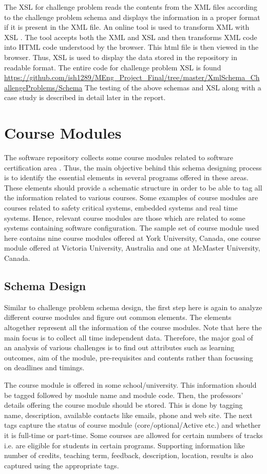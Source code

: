 \documentclass[11pt,letterpaper]{report}
\begin{document}
The XSL for challenge problem reads the contents from the XML files according to the challenge problem schema and displays the information in a proper format if it is present in the XML file. An online tool is used to transform XML with XSL \cite{olXSL}. The tool accepts both the XML and XSL and then transforms XML code into HTML code understood by the browser. This html file is then viewed in the browser. Thus, XSL is used to display the data stored in the repository in readable format. The entire code for challenge problem XSL is found \url{https://github.com/ish1289/MEng_Project_Final/tree/master/XmlSchema_ChallengeProblems/Schema}
\bigskip
The testing of the above schemas and XSL along with a case study is described in detail later in the report. 

\chapter{Course Modules}
The software repository collects some course modules related to software certification area \cite{York,Waterloo, MaC,Victoria}. Thus, the main objective behind this schema designing process is to identify the essential elements in several programs offered in these areas. These elements should provide a schematic structure in order to be able to tag all the information related to various courses. Some examples of course modules are courses related to safety critical systems, embedded systems and real time systems. Hence, relevant course modules are those which are related to some systems containing software configuration. The sample set of course module used here contains nine course modules offered at York University, Canada, one course module offered at Victoria University, Australia and one at McMaster University, Canada.

\section*{Schema Design}
Similar to challenge problem schema design, the first step here is again to analyze different course modules and figure out common elements. The elements altogether represent all the information of the course modules. Note that here the main focus is to collect all time independent data. Therefore, the major goal of an analysis of various challenges is to find out attributes such as learning outcomes, aim of the module, pre-requisites and contents rather than focussing on deadlines and timings.  

The course module is offered in some school/university. This information should be tagged followed by module name and module code. Then, the professors' details offering the course module should be stored. This is done by tagging name, description, available contacts like emails, phone and web site. The next tags capture the status of course module (core/optional/Active etc.) and whether it is full-time or part-time. Some courses are allowed for certain numbers of tracks i.e. are eligible for students in certain programs. Supporting information like number of credits, teaching term, feedback, description, location, results is also captured using the appropriate tags. 
\end{document}
